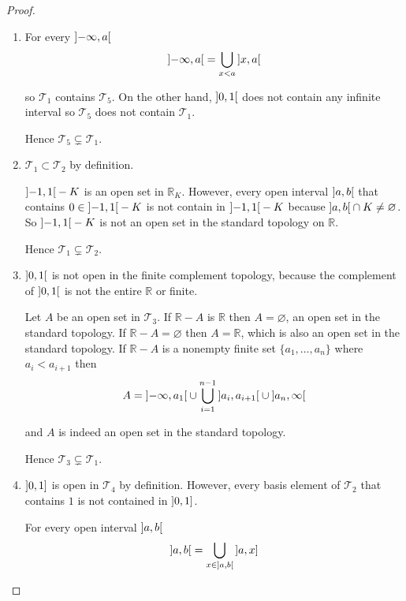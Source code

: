 \begin{proof}
    \begin{enumerate}[label={(\roman*)}]
        \item For every $\left]{-\infty, a}\right[$
              \[
                  \left]{-\infty, a}\right[ = \bigcup_{x < a}\left]{x, a}\right[
              \]

              so $\mathscr{T}_{1}$ contains $\mathscr{T}_{5}$. On the other hand, $\left]{0, 1}\right[$ does not contain any infinite interval so $\mathscr{T}_{5}$ does not contain $\mathscr{T}_{1}$.

              Hence $\mathscr{T}_{5}\subsetneq \mathscr{T}_{1}$.
        \item $\mathscr{T}_{1}\subset \mathscr{T}_{2}$ by definition.

              $\left]{-1, 1}\right[ - K$ is an open set in $\mathbb{R}_{K}$. However, every open interval $\left]{a, b}\right[$ that contains $0\in \left]{-1, 1}\right[ - K$ is not contain in $\left]{-1, 1}\right[ - K$ because $\left]{a, b}\right[\cap K \ne \varnothing$. So $\left]{-1, 1}\right[ - K$ is not an open set in the standard topology on $\mathbb{R}$.

              Hence $\mathscr{T}_{1}\subsetneq \mathscr{T}_{2}$.
        \item $\left]{0, 1}\right[$ is not open in the finite complement topology, because the complement of $\left]{0, 1}\right[$ is not the entire $\mathbb{R}$ or finite.

              Let $A$ be an open set in $\mathscr{T}_{3}$. If $\mathbb{R} - A$ is $\mathbb{R}$ then $A = \varnothing$, an open set in the standard topology. If $\mathbb{R} - A = \varnothing$ then $A = \mathbb{R}$, which is also an open set in the standard topology. If $\mathbb{R} - A$ is a nonempty finite set $\{ a_{1}, \ldots, a_{n} \}$ where $a_{i} < a_{i+1}$ then
              \[
                  A = \left]{-\infty, a_{1}}\right[ \cup \bigcup^{n-1}_{i=1}\left]{a_{i}, a_{i+1}}\right[ \cup \left]{a_{n}, \infty}\right[
              \]

              and $A$ is indeed an open set in the standard topology.

              Hence $\mathscr{T}_{3}\subsetneq \mathscr{T}_{1}$.
        \item $\left]{0, 1}\right]$ is open in $\mathscr{T}_{4}$ by definition. However, every basis element of $\mathscr{T}_{2}$ that contains $1$ is not contained in $\left]{0, 1}\right]$.

              For every open interval $\left]{a, b}\right[$
              \[
                  \left]{a, b}\right[ = \bigcup_{x\in\left]{a, b}\right[}\left]{a, x}\right]
              \]


\end{enumerate}
\end{proof}

